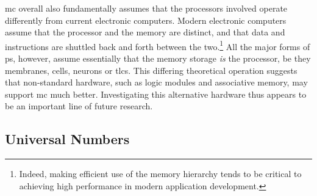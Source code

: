 \Gls{mc} overall also fundamentally assumes that the processors involved operate differently from current electronic computers.  Modern electronic computers assume that the processor and the memory are distinct, and that data and instructions are shuttled back and forth between the two.\footnote{Indeed, making efficient use of the memory hierarchy tends to be critical to achieving high performance in modern application development.}  All the major forms of \gls{ps}, however, assume essentially that the memory storage \emph{is} the processor, be they membranes, cells, neurons or \glspl{tlc}.  This differing theoretical operation suggests that non-standard hardware, such as logic modules and associative memory, may support \gls{mc} much better.  Investigating this alternative hardware thus appears to be an important line of future research.





\subsection{Universal Numbers}


